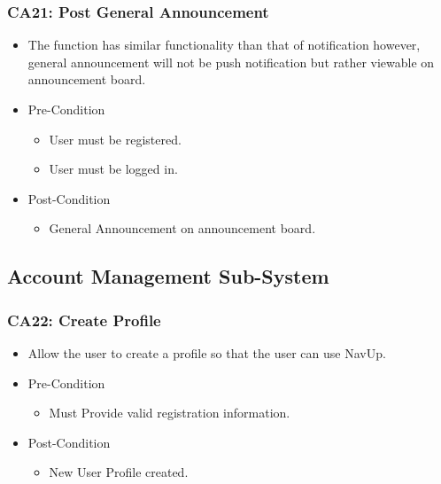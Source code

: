 \documentclass[12pt,a4paper]{article}
\begin{document}
		\subsubsection{CA21: Post General Announcement}
			\begin{itemize}
				\item The function has similar functionality than that of notification however, general announcement will not be push notification but rather viewable on announcement board.
					\item Pre-Condition
						\begin{itemize}
							\item User must be registered.
							\item User must be logged in.
						\end{itemize}
					\item Post-Condition
						\begin{itemize}
							\item General Announcement on announcement board.
						\end{itemize}
			\end{itemize}
	\subsection{Account Management Sub-System}
		\subsubsection{CA22: Create Profile}
			\begin{itemize}
				\item Allow the user to create a profile so that the user can use NavUp.
					\item Pre-Condition
						\begin{itemize}
							\item Must Provide valid registration information.
						\end{itemize}
					\item Post-Condition
						\begin{itemize}
							\item New User Profile created.
						\end{itemize}
			\end{itemize}
\end{document}
